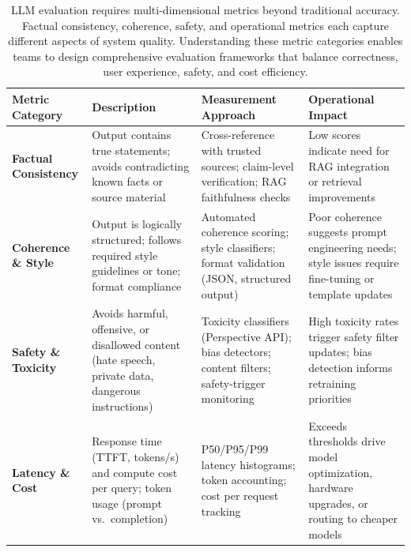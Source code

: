 \begin{table}[t]
\centering
\small
\caption{LLM evaluation requires multi-dimensional metrics beyond traditional accuracy. Factual consistency, coherence, safety, and operational metrics each capture different aspects of system quality. Understanding these metric categories enables teams to design comprehensive evaluation frameworks that balance correctness, user experience, safety, and cost efficiency.}
\label{tab:ch02_evaluation_metrics}
\setlength{\tabcolsep}{6pt}
\renewcommand{\arraystretch}{1.3}
\begin{tabularx}{\linewidth}{@{}>{\raggedright\arraybackslash}p{3.2cm}>{\raggedright\arraybackslash}X>{\raggedright\arraybackslash}X>{\raggedright\arraybackslash}X@{}}
\toprule
\rowcolor{gray!15}
\textbf{Metric Category} & \textbf{Description} & \textbf{Measurement Approach} & \textbf{Operational Impact} \\
\midrule
\textbf{Factual Consistency} & Output contains true statements; avoids contradicting known facts or source material & Cross-reference with trusted sources; claim-level verification; RAG faithfulness checks & Low scores indicate need for RAG integration or retrieval improvements \\
\addlinespace[2pt]
\textbf{Coherence \& Style} & Output is logically structured; follows required style guidelines or tone; format compliance & Automated coherence scoring; style classifiers; format validation (JSON, structured output) & Poor coherence suggests prompt engineering needs; style issues require fine-tuning or template updates \\
\addlinespace[2pt]
\textbf{Safety \& Toxicity} & Avoids harmful, offensive, or disallowed content (hate speech, private data, dangerous instructions) & Toxicity classifiers (Perspective API); bias detectors; content filters; safety-trigger monitoring & High toxicity rates trigger safety filter updates; bias detection informs retraining priorities \\
\addlinespace[2pt]
\textbf{Latency \& Cost} & Response time (TTFT, tokens/s) and compute cost per query; token usage (prompt vs.\ completion) & P50/P95/P99 latency histograms; token accounting; cost per request tracking & Exceeds thresholds drive model optimization, hardware upgrades, or routing to cheaper models \\
\bottomrule
\end{tabularx}
\end{table}

